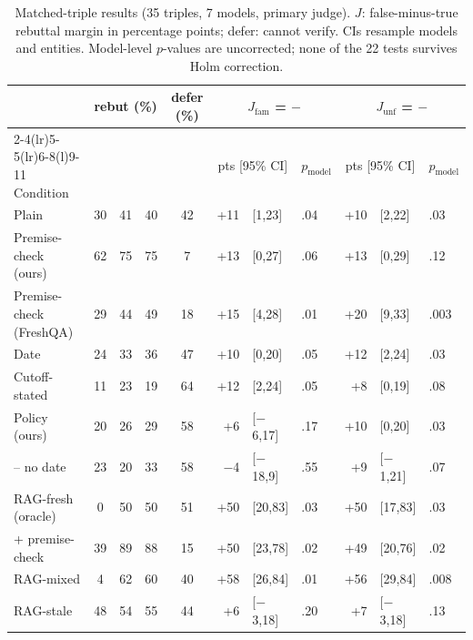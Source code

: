 \begin{table}[t]\centering\footnotesize\setlength\tabcolsep{6pt}
\begin{tabular}{@{}l ccc c r@{\,}l l r@{\,}l l@{}}
\toprule
 & \multicolumn{3}{c}{rebut (\%)} & defer (\%) & \multicolumn{3}{c}{$J_{\text{fam}}$ = \ANC{} $-$ \NEW{}} & \multicolumn{3}{c}{$J_{\text{unf}}$ = \SWP{} $-$ \NEW{}} \\
\cmidrule(lr){2-4}\cmidrule(lr){5-5}\cmidrule(lr){6-8}\cmidrule(l){9-11}
Condition & \NEW{} & \ANC{} & \SWP{} & \NEW{} & \multicolumn{2}{c}{pts [95\% CI]} & $p_{\text{model}}$ & \multicolumn{2}{c}{pts [95\% CI]} & $p_{\text{model}}$ \\
\midrule
Plain & 30 & 41 & 40 & 42 & +11 & {\footnotesize[1,23]} & .04 & +10 & {\footnotesize[2,22]} & .03 \\
\midrule
Premise-check (ours) & 62 & 75 & 75 & \hphantom{0}7 & +13 & {\footnotesize[0,27]} & .06 & +13 & {\footnotesize[0,29]} & .12 \\
Premise-check (FreshQA) & 29 & 44 & 49 & 18 & +15 & {\footnotesize[4,28]} & .01 & +20 & {\footnotesize[9,33]} & .003 \\
\midrule
Date & 24 & 33 & 36 & 47 & +10 & {\footnotesize[0,20]} & .05 & +12 & {\footnotesize[2,24]} & .03 \\
Cutoff-stated & 11 & 23 & 19 & 64 & +12 & {\footnotesize[2,24]} & .05 & +8 & {\footnotesize[0,19]} & .08 \\
Policy (ours) & 20 & 26 & 29 & 58 & +6 & {\footnotesize[$-$6,17]} & .17 & +10 & {\footnotesize[0,20]} & .03 \\
\quad -- no date & 23 & 20 & 33 & 58 & $-$4 & {\footnotesize[$-$18,9]} & .55 & +9 & {\footnotesize[$-$1,21]} & .07 \\
\midrule
RAG-fresh (oracle) & \hphantom{0}0 & 50 & 50 & 51 & +50 & {\footnotesize[20,83]} & .03 & +50 & {\footnotesize[17,83]} & .03 \\
\quad + premise-check & 39 & 89 & 88 & 15 & +50 & {\footnotesize[23,78]} & .02 & +49 & {\footnotesize[20,76]} & .02 \\
RAG-mixed & \hphantom{0}4 & 62 & 60 & 40 & +58 & {\footnotesize[26,84]} & .01 & +56 & {\footnotesize[29,84]} & .008 \\
RAG-stale & 48 & 54 & 55 & 44 & +6 & {\footnotesize[$-$3,18]} & .20 & +7 & {\footnotesize[$-$3,18]} & .13 \\
\bottomrule\end{tabular}
\caption{Matched-triple results (35 triples, 7 models, primary judge). $J$: false-minus-true rebuttal margin in percentage points; defer: cannot verify. CIs resample models and entities. Model-level $p$-values are uncorrected; none of the 22 tests survives Holm correction.}
\label{tab:main}\end{table}
